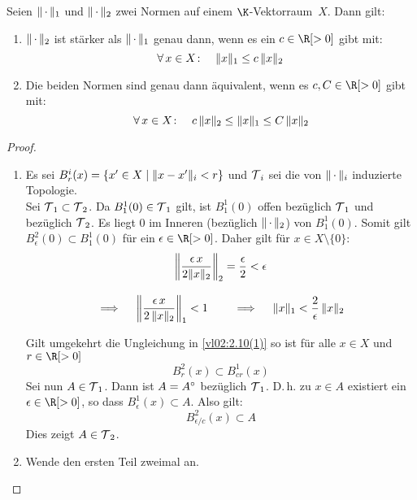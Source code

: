 \begin{thEmpty}
    Seien $\emptyNorm_1$ und $\emptyNorm_2$ zwei Normen auf einem
    $\K$-Vektorraum~$X$. Dann gilt:
    \begin{enumerate}[(1)]
        \item\label{vl02:2.10(1)}
            $\emptyNorm_2$ ist stärker als $\emptyNorm_1$ genau dann, wenn es
            ein $c\in\R[>0]$ gibt mit:
            \[ \forall\,x\in X\colon\quad \norm{x}_1 \leq c\,\norm{x}_2 \]
        \item
            Die beiden Normen sind genau dann äquivalent, wenn es $c,C\in\R[>0]$
            gibt mit:
            \[ \forall\,x\in X\colon\quad c\,\norm{x}_2 \leq \norm{x}_1 \leq C\,\norm{x}_2 \]
    \end{enumerate}
\end{thEmpty}

\begin{proof}
    \begin{enumerate}[(1)]
        \item
            Es sei $B_r^i(x) = \{ x'\in X \Mid \norm{x-x'}_i < r \}$ und $\Topo_i$ sei die von
            $\emptyNorm_i$ induzierte Topologie.
            \\
            Sei $\Topo_1\subset\Topo_2$. Da $B_1^1(0) \in \Topo_1$ gilt, ist
            $B_1^1(0)$ offen
            bezüglich $\Topo_1$ und bezüglich $\Topo_2$. Es liegt $0$ im Inneren
            (bezüglich $\emptyNorm_2$) von $B_1^1(0)$. Somit gilt
            $B_\epsilon^2(0) \subset
            B_1^1(0)$ für ein $\epsilon\in\R[>0]$. Daher gilt für $x\in X\setminus\{0\}$:
            \begin{gather*}
                \norm*{ \frac{\epsilon\,x}{2\norm{x}_2} }_2 = \frac{\epsilon}{2} 
                < \epsilon
                \\[2ex]
                \implies\quad \norm*{\frac{\epsilon\,x}{2\,\norm{x}_2}}_1 < 1
                \qquad\implies\quad \norm{x}_1 < \frac{2}{\epsilon}\,\norm{x}_2
            \end{gather*}

            Gilt umgekehrt die Ungleichung in \ref{vl02:2.10(1)} 
            so ist für alle $x\in X$ und $r\in\R[>0]$
            \[ B_r^2(x) \subset B_{cr}^1(x) \]
            Sei nun $A\in\Topo_1$. Dann ist $A=\setinterior{A}$ bezüglich $\Topo_1$.
            D.\,h. zu $x\in A$ existiert ein $\epsilon\in\R[>0]$, so dass
            $B_\epsilon^1(x)\subset A$. Also gilt:
            \[ B_{\epsilon/c}^2(x) \subset A \]
            Dies zeigt $A\in\Topo_2$.

        \item
            Wende den ersten Teil zweimal an.
    \end{enumerate}
\end{proof}

